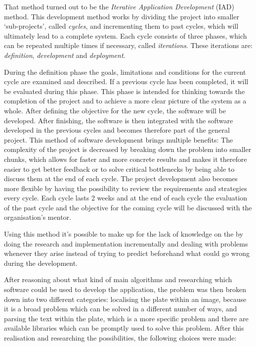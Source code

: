 That method turned out to be the \emph{Iterative Application Development} (IAD) method. This development method works by dividing the project into smaller `sub-projects', called \emph{cycles}, and incrementing them to past cycles, which will ultimately lead to a complete system. Each cycle consists of three phases, which can be repeated multiple times if necessary, called \emph{iterations}. These iterations are: \emph{definition}, \emph{development} and \emph{deployment}.

During the definition phase the goals, limitations and conditions for the current cycle are examined and described. If a previous cycle has been completed, it will be evaluated during this phase. This phase is intended for thinking towards the completion of the project and to achieve a more clear picture of the system as a whole.
After defining the objective for the new cycle, the software will be developed. After finishing, the software is then integrated with the software developed in the previous cycles and becomes therefore part of the general project. This method of software development brings multiple benefits: The complexity of the project is decreased by breaking down the problem into smaller chunks, which allows for faster and more concrete results and makes it therefore easier to get better feedback or to solve critical bottlenecks by being able to discuss them at the end of each cycle. The project development also becomes more flexible by having the possibility to review the requirements and strategies every cycle. Each cycle lasts 2 weeks and at the end of each cycle the evaluation of the past cycle and the objective for the coming cycle will be discussed with the organisation's mentor.

Using this method it's possible to make up for the lack of knowledge on the by doing the research and implementation incrementally and dealing with problems whenever they arise instead of trying to predict beforehand what could go wrong during the development.


After reasoning about what kind of main algorithms and researching which software could be used to develop the application, the problem was then broken down into two different categories: localising the plate within an image, because it is a broad problem which can be solved in a different number of ways, and parsing the text within the plate, which is a more specific problem and there are available libraries which can be promptly used to solve this problem. After this realisation and researching the possibilities, the following choices were made:

